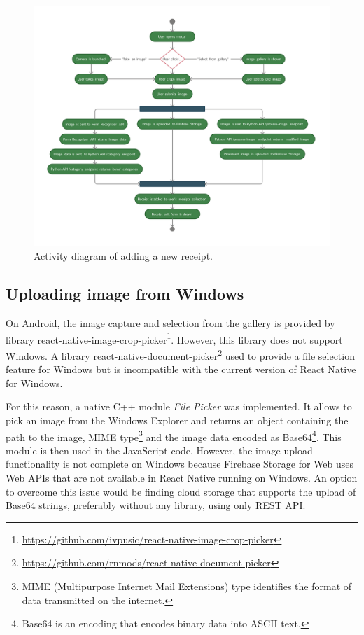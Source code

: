 \documentclass[
  digital, %
  table,   %
  oneside, %
  lof,     %
  lot,     %
]{fithesis3}
\newcommand{\definition}[1]{{#1}}
\begin{document}
\begin{figure}
    \begin{center}
        \includegraphics[width=\textwidth]{figures/diagrams/add_receipt_android}
    \end{center}
    \caption{Activity diagram of adding a new receipt.}
    \label{fig:add_receipt_android}
\end{figure}

\subsection{Uploading image from Windows}
On Android, the image capture and selection from the gallery is provided by library react-native-image-crop-picker\footnote{\url{https://github.com/ivpusic/react-native-image-crop-picker}}. However, this library does not support Windows. A library react-native-document-picker\footnote{\url{https://github.com/rnmods/react-native-document-picker}} used to provide a file selection feature for Windows but is incompatible with the current version of React Native for Windows. 

For this reason, a native C++ module \textit{File Picker} was implemented. It allows to pick an image from the Windows Explorer and returns an object containing the path to the image, MIME type\footnote{MIME (Multipurpose Internet Mail Extensions) type identifies the format of data transmitted on the internet.} and the image data encoded as Base64\footnote{\definition{Base64} is an encoding that encodes binary data into ASCII text.}. This module is then used in the JavaScript code. However, the image upload functionality is not complete on Windows because Firebase Storage for Web uses Web APIs that are not available in React Native running on Windows. An option to overcome this issue would be finding cloud storage that supports the upload of Base64 strings, preferably without any library, using only REST API.
\end{document}
